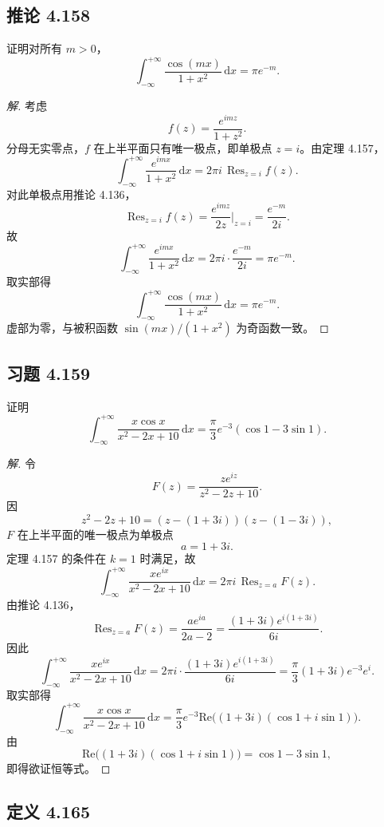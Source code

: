\documentclass[11pt,a4paper]{article}
\renewcommand{\Re}{\mathrm{Re}}
\newcommand{\dd}{\mathrm{d}}
\newcommand{\Res}{\operatorname{Res}}
\theoremstyle{definition}
\newenvironment{solution}{\begin{proof}[解]}{\end{proof}}
\begin{document}
\subsection{推论 4.158}

证明对所有 $m>0$，
\[
  \int_{-\infty}^{+\infty}\frac{\cos(mx)}{1+x^2}\,\dd x
  =\pi e^{-m}.
\]

\begin{solution}
  考虑
  \[
    f(z)=\frac{e^{imz}}{1+z^2}.
  \]
  分母无实零点，$f$ 在上半平面只有唯一极点，即单极点 $z=i$。由定理 4.157，
  \[
    \int_{-\infty}^{+\infty}\frac{e^{imx}}{1+x^2}\,\dd x
    =
    2\pi i\,\Res_{z=i}f(z).
  \]
  对此单极点用推论 4.136，
  \[
    \Res_{z=i}f(z)
    =
    \frac{e^{imz}}{2z}\bigg|_{z=i}
    =
    \frac{e^{-m}}{2i}.
  \]
  故
  \[
    \int_{-\infty}^{+\infty}\frac{e^{imx}}{1+x^2}\,\dd x
    =
    2\pi i\cdot \frac{e^{-m}}{2i}
    =
    \pi e^{-m}.
  \]
  取实部得
  \[
    \int_{-\infty}^{+\infty}\frac{\cos(mx)}{1+x^2}\,\dd x
    =\pi e^{-m}.
  \]
  虚部为零，与被积函数 $\sin(mx)/(1+x^2)$ 为奇函数一致。
\end{solution}

\subsection{习题 4.159}

证明
\[
  \int_{-\infty}^{+\infty}
  \frac{x\cos x}{x^2-2x+10}\,\dd x
  =
  \frac{\pi}{3}e^{-3}(\cos 1-3\sin 1).
\]

\begin{solution}
  令
  \[
    F(z)=\frac{z e^{iz}}{z^2-2z+10}.
  \]
  因
  \[
    z^2-2z+10=(z-(1+3i))(z-(1-3i)),
  \]
  $F$ 在上半平面的唯一极点为单极点
  \[
    a=1+3i.
  \]
  定理 4.157 的条件在 $k=1$ 时满足，故
  \[
    \int_{-\infty}^{+\infty}
    \frac{x e^{ix}}{x^2-2x+10}\,\dd x
    =
    2\pi i\,\Res_{z=a}F(z).
  \]
  由推论 4.136，
  \[
    \Res_{z=a}F(z)
    =
    \frac{a e^{ia}}{2a-2}
    =
    \frac{(1+3i)e^{i(1+3i)}}{6i}.
  \]
  因此
  \[
    \int_{-\infty}^{+\infty}
    \frac{x e^{ix}}{x^2-2x+10}\,\dd x
    =
    2\pi i\cdot
    \frac{(1+3i)e^{i(1+3i)}}{6i}
    =
    \frac{\pi}{3}(1+3i)e^{-3}e^{i}.
  \]
  取实部得
  \[
    \int_{-\infty}^{+\infty}
    \frac{x\cos x}{x^2-2x+10}\,\dd x
    =
    \frac{\pi}{3}e^{-3}
    \Re\bigl((1+3i)(\cos 1+i\sin 1)\bigr).
  \]
  由
  \[
    \Re\bigl((1+3i)(\cos 1+i\sin 1)\bigr)
    =
    \cos 1-3\sin 1,
  \]
  即得欲证恒等式。
\end{solution}

\subsection{定义 4.165}
\end{document}
